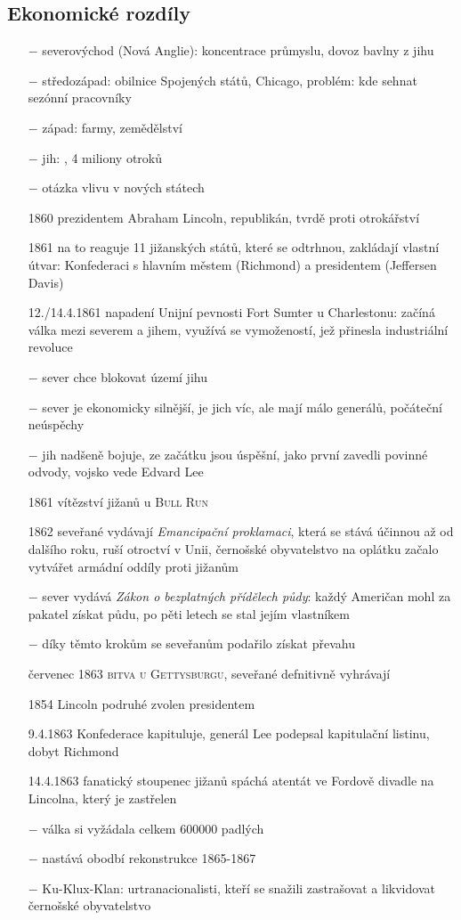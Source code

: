 \documentclass{article}
\begin{document}
\subsection*{Ekonomické rozdíly}
\begin{itemize}
    \vspace{-0.5em}
    \setlength\itemsep{0.15em}
    \item[$-$] severovýchod (Nová Anglie): koncentrace průmyslu, dovoz bavlny z jihu
    \item[$-$] středozápad: obilnice Spojených států, Chicago, problém: kde sehnat sezónní pracovníky
    \item[$-$] západ: farmy, zemědělství
    \item[$-$] jih: , 4 miliony otroků
    \item[$-$] otázka vlivu v nových státech
    \item[1860] prezidentem Abraham Lincoln, republikán, tvrdě proti otrokářství
    \item[1861] na to reaguje 11 jižanských států, které se odtrhnou, zakládají vlastní útvar: Konfederaci s hlavním městem (Richmond) a presidentem (Jeffersen Davis)
    \item[12./14.4.1861] napadení Unijní pevnosti Fort Sumter u Charlestonu: začíná válka mezi severem a jihem, využívá se vymožeností, jež přinesla industriální revoluce
    \item[$-$] sever chce blokovat území jihu
    \item[$-$] sever je ekonomicky silnější, je jich víc, ale mají málo generálů, počáteční neúspěchy
    \item[$-$] jih nadšeně bojuje, ze začátku jsou úspěšní, jako první zavedli povinné odvody, vojsko vede Edvard Lee
    \item[1861] vítězství jižanů u \textsc{Bull Run}
    \item[1862] seveřané vydávají \textit{Emancipační proklamaci}, která se stává účinnou až od dalšího roku, ruší otroctví v Unii, černošské obyvatelstvo na oplátku začalo vytvářet armádní oddíly proti jižanům
    \item[$-$] sever vydává \textit{Zákon o bezplatných přídělech půdy}: každý Američan mohl za pakatel získat půdu, po pěti letech se stal jejím vlastníkem
    \item[$-$] díky těmto krokům se seveřanům podařilo získat převahu
    \item[červenec 1863] \textsc{bitva u Gettysburgu}, seveřané defnitivně vyhrávají
    \item[1854] Lincoln podruhé zvolen presidentem
    \item[9.4.1863] Konfederace kapituluje, generál Lee podepsal kapitulační listinu, dobyt Richmond
    \item[14.4.1863] fanatický stoupenec jižanů spáchá atentát ve Fordově divadle na Lincolna, který je zastřelen
    \item[$-$] válka si vyžádala celkem 600000 padlých
    \item[$-$] nastává obodbí rekonstrukce 1865-1867
    \item[$-$] Ku-Klux-Klan: urtranacionalisti, kteří se snažili zastrašovat a likvidovat černošské obyvatelstvo
\end{itemize}
\end{document}
